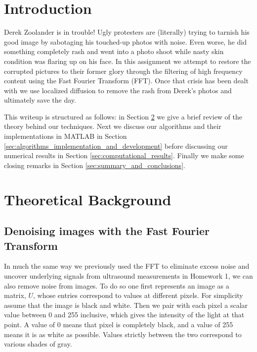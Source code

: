 \documentclass[fleqn,10pt]{../SelfArx} %
\affiliation{\textsuperscript{1}\textit{Department of Applied Mathematics, University of Washington, Seattle}} %
\begin{document}
\flushbottom %

\maketitle %

\tableofcontents %



\section{Introduction}
\label{sec:introduction}
Derek Zoolander is in trouble! Ugly protesters are (literally) trying to tarnish his good image by sabotaging his touched-up photos with noise. Even worse, he did something completely rash and went into a photo shoot while nasty skin condition was flaring up on his face. In this assignment we attempt to restore the corrupted pictures to their former glory through the filtering of high frequency content using the Fast Fourier Transform (FFT). Once that crisis has been dealt with we use localized diffusion to remove the rash from Derek's photos and ultimately save the day.

This writeup is structured as follows: in Section \ref{sec:theoretical_background} we give a brief review of the theory behind our techniques. Next we discuss our algorithms and their implementations in MATLAB in Section \ref{sec:algorithms_implementation_and_development} before discussing our numerical results in Section \ref{sec:computational_results}. Finally we make some closing remarks in Section \ref{sec:summary_and_conclusions}.



\section{Theoretical Background} %
\label{sec:theoretical_background}
\subsection{Denoising images with the Fast Fourier Transform}
In much the same way we previously used the FFT to eliminate excess noise and uncover underlying signals from ultrasound measurements in Homework 1, we can also remove noise from images. To do so one first represents an image as a matrix, $U$, whose entries correspond to values at different pixels. For simplicity assume that the image is black and white. Then we pair with each pixel a scalar value between 0 and 255 inclusive, which gives the intensity of the light at that point. A value of 0 means that pixel is completely black, and a value of 255 means it is as white as possible. Values strictly between the two correspond to various shades of gray.
\end{document}
